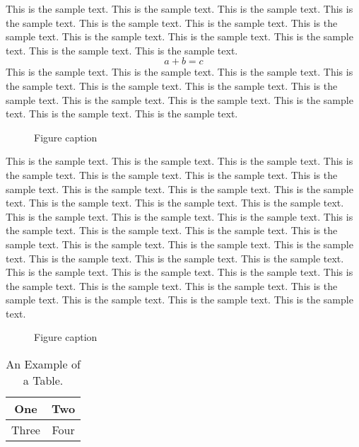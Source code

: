 \documentclass[preprint]{ptephy_v1}%
\begin{document}
This is the sample text. This is the sample text. This is the sample text. This is the sample text.
This is the sample text. This is the sample text. This is the sample text. This is the sample text.
This is the sample text. This is the sample text. This is the sample text. This is the sample text.
\begin{equation}
a + b = c
\end{equation}
This is the sample text. This is the sample text. This is the sample text. This is the sample text.
This is the sample text. This is the sample text. This is the sample text. This is the sample text.
This is the sample text. This is the sample text. This is the sample text. This is the sample text.

\begin{figure}[!h]
\caption{Figure caption}
\end{figure}

This is the sample text. This is the sample text. This is the sample text. This is the sample text.
This is the sample text. This is the sample text. This is the sample text. This is the sample text.
This is the sample text. This is the sample text. This is the sample text. This is the sample text.
This is the sample text. This is the sample text. This is the sample text. This is the sample text.
This is the sample text. This is the sample text. This is the sample text. This is the sample text.
This is the sample text. This is the sample text. This is the sample text. This is the sample text.
This is the sample text. This is the sample text. This is the sample text. This is the sample text.
This is the sample text. This is the sample text. This is the sample text. This is the sample text.
This is the sample text. This is the sample text. This is the sample text. This is the sample text.

\begin{figure}[!h]
\caption{Figure caption}
\end{figure}

\begin{table}[!h]
\caption{An Example of a Table.}%
\label{table_example}
\centering
\begin{tabular}{|c||c|}%
\hline
One & Two\\ %
\hline
Three & Four\\%
\hline
\end{tabular}
\end{table}%
\end{document}
